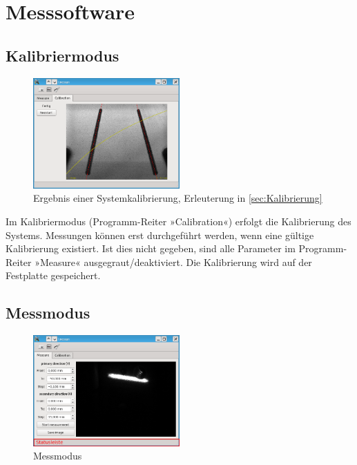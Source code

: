 \documentclass[a4paper,10pt]{scrartcl}
\begin{document}
\newpage

\section{Messsoftware}

\subsection{Kalibriermodus}

\begin{figure}[H]
  \centering
  \includegraphics[width=0.5\textwidth]{include/calib.png}
  \caption{Ergebnis einer Systemkalibrierung, Erleuterung in \cref{sec:Kalibrierung}}
  \label{fig:Kalibrierung}
\end{figure}

Im Kalibriermodus (Programm-Reiter »Calibration«) erfolgt die Kalibrierung des Systems.
Messungen können erst durchgeführt werden, wenn eine gültige Kalibrierung existiert.
Ist dies nicht gegeben, sind alle Parameter im Programm-Reiter »Measure« ausgegraut/deaktiviert.
Die Kalibrierung wird auf der Festplatte gespeichert.

\subsection{Messmodus}

\begin{figure}[H]
  \centering
  \includegraphics[width=0.5\textwidth]{include/measure.png}
  \caption{Messmodus}
  \label{fig:Messmodus}
\end{figure}
\end{document}
